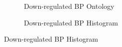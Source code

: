 \documentclass[12pt,letterpaper]{article}
\begin{document}
\begin{figure}[H]
\centering
\begin{subfigure}[b]{0.48\textwidth}
    \centering
    \caption{Down-regulated BP Ontology}
    \label{fig:enter-label}
\end{subfigure}
\begin{subfigure}[b]{0.48\textwidth}
    \centering
    \caption{Down-regulated BP Histogram}
    \label{fig:enter-label}
\end{subfigure}\par

\end{figure}
\end{document}
